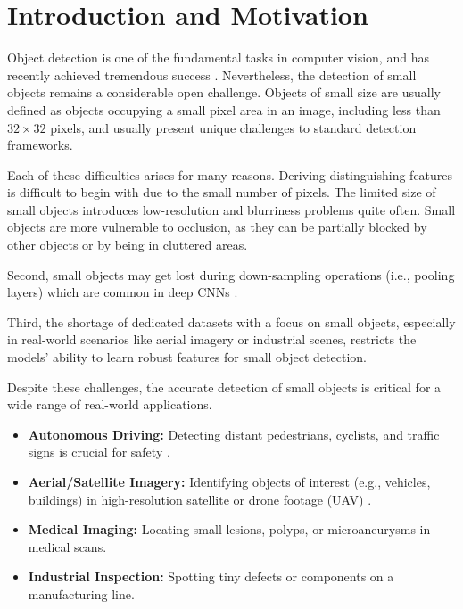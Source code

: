 \section{Introduction and Motivation}
\label{sec:introduction}

Object detection is one of the fundamental tasks in computer vision, and has recently achieved tremendous success \cite{Ren2015FasterRCNN}.
Nevertheless, the detection of small objects remains a considerable open challenge.
Objects of small size are usually defined as objects occupying a small pixel area in an image, including less than $32 \times 32$ pixels, and usually present unique challenges to standard detection frameworks.

Each of these difficulties arises for many reasons.
Deriving distinguishing features is difficult to begin with due to the small number of pixels. The limited size of small objects introduces low-resolution and blurriness problems quite often.
Small objects are more vulnerable to occlusion, as they can be partially blocked by other objects or by being in cluttered areas.

Second, small objects may get lost during down-sampling operations (i.e., pooling layers) which are common in deep CNNs \cite{He2016ResNet}.

Third, the shortage of dedicated datasets with a focus on small objects, especially in real-world scenarios like aerial imagery or industrial scenes, restricts the models' ability to learn robust features for small object detection.

Despite these challenges, the accurate detection of small objects is critical for a wide range of real-world applications.
\begin{itemize}
    \item \textbf{Autonomous Driving:} Detecting distant pedestrians, cyclists, and traffic signs is crucial for safety \cite{Geiger2012KITTI}.
    \item \textbf{Aerial/Satellite Imagery:} Identifying objects of interest (e.g., vehicles, buildings) in high-resolution satellite or drone footage (UAV) \cite{zhu2023visdrone, xia2018dota}.
    \item \textbf{Medical Imaging:} Locating small lesions, polyps, or microaneurysms in medical scans.
    \item \textbf{Industrial Inspection:} Spotting tiny defects or components on a manufacturing line.
\end{itemize}

